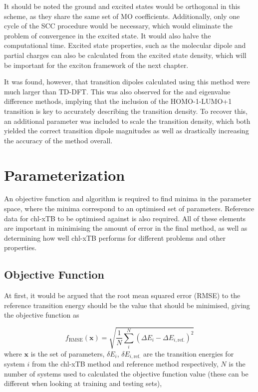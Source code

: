 It should be noted the ground and excited states would be orthogonal in this scheme,
as they share the same set of MO coefficients. Additionally, only one cycle of the
SCC procedure would be necessary, which would eliminate the problem of convergence
in the \dscf excited state. It would also halve the computational time.
Excited state properties, such as the molecular dipole and partial charges can
also be calculated from the excited state density, which will be important for
the exciton framework of the next chapter.

It was found, however, that transition dipoles calculated using this method were
much larger than TD-DFT. This was also observed for the \dscf and eigenvalue
difference methods, implying that the inclusion of the HOMO-1-LUMO+1 transition
is key to accurately describing the transition density. To recover this, an additional
parameter was included to scale the transition density, which both yielded the 
correct transition dipole magnitudes as well as drastically increasing the accuracy
of the method overall.

\afterpartskip
\section{Parameterization}
\label{sec:chl_params}
An objective function and algorithm is required to find minima in the parameter 
space, where the minima correspond to an optimised set of parameters. Reference data
for chl-xTB to be optimised against is also required. All of these elements are 
important in minimising the amount of error in the final method, as well as determining 
how well chl-xTB performs for different problems and other properties.

\subsection{Objective Function}
\label{subsec:obj_func}
At first, it would be argued that the root mean squared error (RMSE) to the reference 
transition energy should be the value that should be minimised, giving the objective
function as

\begin{equation}
f_{\text{RMSE}}\left(\mathbf{x}\right) = \sqrt{ \frac{1}{N} \sum^N_i \left( \Delta E_i  - \Delta E_{i, \text{ref.}}\right)^2}
\end{equation}
%
where $\textbf{x}$ is the set of parameters, $\delta E_i$, $\delta E_{i,\text{ref.}}$ 
are the transition energies for system $i$ from the chl-xTB method and reference
method respectively, $N$ is the number of systems used to calculated the objective
function value (these can be different when looking at training and testing sets),

